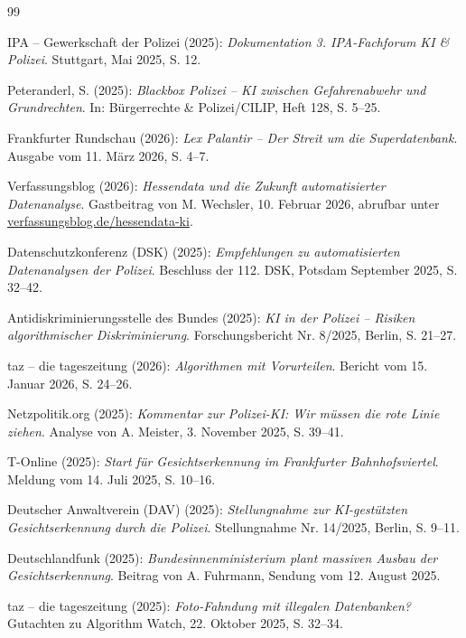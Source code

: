 \documentclass[12pt,a4paper]{article}
\begin{document}
	\newpage
	\begin{thebibliography}{99}
		
		 IPA – Gewerkschaft der Polizei (2025): \emph{Dokumentation 3. IPA-Fachforum KI \& Polizei}. Stuttgart, Mai 2025, S. 12.
		
		 Peteranderl, S. (2025): \emph{Blackbox Polizei – KI zwischen Gefahrenabwehr und Grundrechten}. In: Bürgerrechte \& Polizei/CILIP, Heft 128, S. 5–25.
		
		 Frankfurter Rundschau (2026): \emph{Lex Palantir – Der Streit um die Superdatenbank}. Ausgabe vom 11. März 2026, S. 4–7.
		
		 Verfassungsblog (2026): \emph{Hessendata und die Zukunft automatisierter Datenanalyse}. Gastbeitrag von M. Wechsler, 10. Februar 2026, abrufbar unter \url{verfassungsblog.de/hessendata-ki}.
		
		 Datenschutzkonferenz (DSK) (2025): \emph{Empfehlungen zu automatisierten Datenanalysen der Polizei}. Beschluss der 112. DSK, Potsdam September 2025, S. 32–42.
		
		 Antidiskriminierungsstelle des Bundes (2025): \emph{KI in der Polizei – Risiken algorithmischer Diskriminierung}. Forschungsbericht Nr. 8/2025, Berlin, S. 21–27.
		
		 taz – die tageszeitung (2026): \emph{Algorithmen mit Vorurteilen}. Bericht vom 15. Januar 2026, S. 24–26.
		
		 Netzpolitik.org (2025): \emph{Kommentar zur Polizei-KI: Wir müssen die rote Linie ziehen}. Analyse von A. Meister, 3. November 2025, S. 39–41.
		
		 T-Online (2025): \emph{Start für Gesichtserkennung im Frankfurter Bahnhofsviertel}. Meldung vom 14. Juli 2025, S. 10–16.
		
		 Deutscher Anwaltverein (DAV) (2025): \emph{Stellungnahme zur KI-gestützten Gesichtserkennung durch die Polizei}. Stellungnahme Nr. 14/2025, Berlin, S. 9–11.
		
		 Deutschlandfunk (2025): \emph{Bundesinnenministerium plant massiven Ausbau der Gesichtserkennung}. Beitrag von A. Fuhrmann, Sendung vom 12. August 2025.
		
		 taz – die tageszeitung (2025): \emph{Foto-Fahndung mit illegalen Datenbanken?} Gutachten zu Algorithm Watch, 22. Oktober 2025, S. 32–34.
		

\end{thebibliography}
\end{document}
